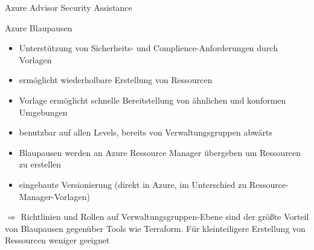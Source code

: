 \begin{flashcard}[Describe]{Azure Advisor Security Assistance}

\end{flashcard}

\begin{flashcard}[Describe]{Azure Blaupausen}
    \begin{itemize}
        \item Unterstützung von Sicherheits- und Complience-Anforderungen durch Vorlagen
        \item ermöglicht wiederholbare Erstellung von Ressourcen
        \item Vorlage ermöglicht schnelle Bereitstellung von ähnlichen und konformen Umgebungen
        \item benutzbar auf allen Levels, bereits von Verwaltungsgruppen abwärts
        \item Blaupausen werden an Azure Ressource Manager übergeben um Ressourcen zu erstellen
        \item eingebaute Versionierung (direkt in Azure, im Unterschied zu Ressource-Manager-Vorlagen)
    \end{itemize}
    $\Rightarrow$ Richtlinien und Rollen auf Verwaltungsgruppen-Ebene sind der größte Vorteil von Blaupausen gegenüber Tools wie Terraform.
    Für kleinteiligere Erstellung von Ressourcen weniger geeignet

\end{flashcard} 
